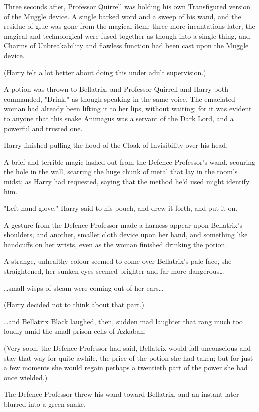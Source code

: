 Three seconds after, Professor Quirrell was holding his own Transfigured
version of the Muggle device. A single barked word and a sweep of his wand, and
the residue of glue was gone from the magical item; three more incantations
later, the magical and technological were fused together as though into a
single thing, and Charms of Unbreakability and flawless function had been cast
upon the Muggle device.

(Harry felt a lot better about doing this under adult supervision.)

A potion was thrown to Bellatrix, and Professor Quirrell and Harry both
commanded, "Drink," as though speaking in the same voice. The emaciated woman
had already been lifting it to her lips, without waiting; for it was evident to
anyone that this snake Animagus was a servant of the Dark Lord, and a powerful
and trusted one.

Harry finished pulling the hood of the Cloak of Invisibility over his head.

A brief and terrible magic lashed out from the Defence Professor’s wand,
scouring the hole in the wall, scarring the huge chunk of metal that lay in the
room’s midst; as Harry had requested, saying that the method he’d used might
identify him.

"Left-hand glove," Harry said to his pouch, and drew it forth, and put it on.

A gesture from the Defence Professor made a harness appear upon Bellatrix’s
shoulders, and another, smaller cloth device upon her hand, and something like
handcuffs on her wrists, even as the woman finished drinking the potion.

A strange, unhealthy colour seemed to come over Bellatrix’s pale face, she
straightened, her sunken eyes seemed brighter and far more dangerous…

…small wisps of steam were coming out of her ears…

(Harry decided not to think about that part.)

…and Bellatrix Black laughed, then, sudden mad laughter that rang much
too loudly amid the small prison cells of Azkaban.

(Very soon, the Defence Professor had said, Bellatrix would fall unconscious
and stay that way for quite awhile, the price of the potion she had taken; but
for just a few moments she would regain perhaps a twentieth part of the power
she had once wielded.)

The Defence Professor threw his wand toward Bellatrix, and an instant later
blurred into a green snake.

